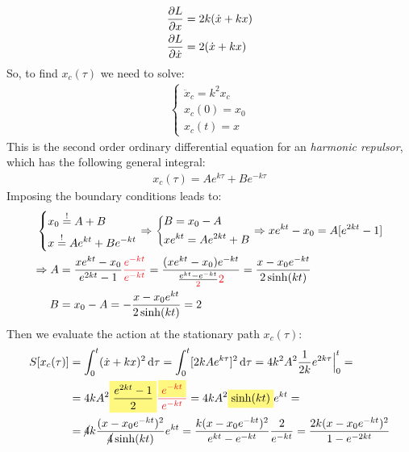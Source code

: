 \documentclass[../template.tex]{subfiles}
\begin{document}
\begin{example}
\begin{align*}
        \pdv{L}{x} &= 2k(\dot{x} + kx)\\
        \pdv{L}{\dot{x}} &= 2(\dot{x} + kx)
    \end{align*}
    So, to find $x_c(\tau)$ we need to solve:
    \begin{align*}
        \begin{cases}
            \ddot{x}_c = k^2 x_c\\
            x_c(0) = x_0\\
            x_c(t) = x
        \end{cases}
    \end{align*}
    This is the second order ordinary differential equation for an \textit{harmonic repulsor}, which has the following general integral:
    \begin{align*}
        x_c(\tau) = A e^{k \tau} + B e^{-k \tau}
    \end{align*}
    Imposing the boundary conditions leads to:
    \begin{align*}\span
        \begin{dcases}
            x_0 \overset{!}{=} A + B\\
            x \overset{!}{=} A e^{k t} + B e^{-kt}
        \end{dcases} \Rightarrow \begin{dcases}
            B = x_0 - A\\
            x e^{kt} = A e^{2kt} + B
        \end{dcases} \Rightarrow xe^{kt} - x_0 = A[e^{2kt} -1]\\
        \Rightarrow A &= \frac{x e^{kt} - x_0}{e^{2kt} - 1} \textcolor{Red}{\frac{e^{-kt}}{e^{-kt}}} = \frac{(x e^{kt} - x_0) e^{-kt}}{\frac{e^{kt} - e^{-kt}}{\textcolor{Red}{2} } \textcolor{Red}{2}} = \frac{x -x_0 e^{-kt}}{2 \sinh (kt)}\\
         B &=  x_0 - A = -\frac{x - x_0 e^{kt}}{2 \sinh(kt)} = 2
    \end{align*}
    Then we evaluate the action at the stationary path $x_c(\tau)$:
    \begin{align*}
        S[x_c(\tau)] &= \int_0^t (\dot{x} + kx)^2 \dd{\tau} = \int_0^t [2k A e^{k \tau}]^2 \dd{\tau} = 4k^2 A^2 \frac{1}{2k} e^{2k \tau} \Big|_0^t =\\
        &=4kA^2\hlc{Yellow}{\frac{e^{2kt} - 1}{2}} \textcolor{Red}{\frac{\hlc{Yellow}{e^{-kt}}}{e^{-kt}} } = 4kA^2 \hlc{Yellow}{\sinh(kt)} e^{kt} =\\
        &=\cancel{4}k \frac{(x-x_0 e^{-kt})^2}{\cancel{4} \sinh(kt)} e^{kt} = \frac{k(x - x_0 e^{-kt})^2}{e^{kt} - e^{-kt}} \frac{2}{e^{-kt}} = \frac{2k (x-x_0 e^{-kt})^2}{1-e^{-2kt}}   

\end{align*}
\end{example}
\end{document}
